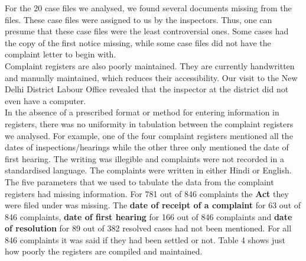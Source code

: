 \documentclass[a4paper, 12pt, twoside]{article}
\begin{document}
For the 20 case files we analysed, we found several documents missing from the files. These case files were assigned to us by the inspectors. Thus, one can presume that these case files were the least controversial ones. Some cases had the copy of the first notice missing, while some case files did not have the complaint letter to begin with. \\

Complaint registers are also poorly maintained. They are currently handwritten and manually maintained, which reduces their accessibility. Our visit to the New Delhi District Labour Office revealed that the inspector at the district did not even have a computer. \\
 
In the absence of a prescribed format or method for entering information in registers, there was no uniformity in tabulation between the complaint registers we analysed. For example, one of the four complaint registers mentioned all the dates of inspections/hearings while the other three only mentioned the date of first hearing. The writing was illegible and complaints were not recorded in a standardised language. The complaints were written in either Hindi or English. \\

The five parameters that we used to tabulate the data from the complaint registers had missing information. For 781 out of 846 complaints the \textbf{Act} they were filed under was missing. The \textbf{date of receipt of a complaint} for 63 out of 846 complaints, \textbf{date of first hearing} for 166 out of 846 complaints and \textbf{date of resolution} for 89 out of 382 resolved cases had not been mentioned. For all 846 complaints it was said if they had been settled or not. Table 4 shows just how poorly the registers are compiled and maintained. 
\end{document}
